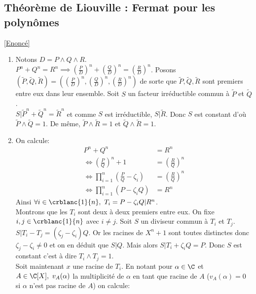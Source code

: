 \documentclass{book}
\begin{document}
	\subsection{Théorème de Liouville : Fermat pour les polynômes }
	\label{Théorème de Liouville : Fermat pour les polynômes corrigé}
	\textcolor{blue}{\hyperref[Théorème de Liouville : Fermat pour les polynômes]{[Enoncé]}}\\
	\begin{enumerate}
		\item Notons $D=P\land Q\land R$.\\
		$P^n+Q^n=R^n\implies \left(\displaystyle\frac{P}{D}\right)^n+\left(\displaystyle\frac{Q}{D}\right)^n=\left(\displaystyle\frac{R}{D}\right)^n$. Posons $(\tilde{P},\tilde{Q},\tilde{R})=\left(\left(\displaystyle\frac{P}{D}\right)^n,\left(\displaystyle\frac{Q}{D}\right)^n,\left(\displaystyle\frac{R}{D}\right)^n\right)$ de sorte que $\tilde{P},\tilde{Q},\tilde{R}$ sont premiers entre eux dans leur ensemble. Soit $S$ un facteur irréductible commun à $\tilde{P}$ et $\tilde{Q}$.\\
		$S|\tilde{P}^n+\tilde{Q}^n=\tilde{R}^n$ et comme $S$ est irréductible, $S|\tilde{R}$. Donc $S$ est constant d'où $\tilde{P}\land \tilde{Q}=1$. De même, $\tilde{P}\land \tilde{R}=1$ et $\tilde{Q}\land \tilde{R}=1$.
		\item On calcule:
		\begin{align*}
			P^n+Q^n&=R^n\\
			\iff \left(\displaystyle\frac{P}{Q}\right)^n+1&=\left(\displaystyle\frac{R}{Q}\right)^n\\
			\iff \displaystyle\prod\limits_{i=1}^n{\left(\displaystyle\frac{P}{Q}-\zeta_i\right)}&=\left(\displaystyle\frac{R}{Q}\right)^n\\
			\iff \displaystyle\prod\limits_{i=1}^n{(P-\zeta_iQ)}&=R^n
		\end{align*}
		Ainsi $\forall i\in \crblanc{1}{n},\ T_i=P-\zeta_iQ|R^n$.\\
		Montrons que les $T_i$ sont deux à deux premiers entre eux. On fixe $i,j\in \crblanc{1}{n}$ avec $i\ne j$. Soit $S$ un diviseur commun à $T_i$ et $T_j$.\\
		$S|T_i-T_j=(\zeta_j-\zeta_i)Q$. Or les racines de $X^n+1$ sont toutes distinctes donc $\zeta_j-\zeta_i\ne 0$ et on en déduit que $S|Q$. Mais alors $S|T_i+\zeta_iQ=P$. Donc $S$ est constant c'est à dire $T_i\land T_j=1$.\\
		Soit maintenant $x$ une racine de $T_i$. En notant pour $\alpha\in \C$ et $A\in \C[X],\ v_A(\alpha)$ la multiplicité de $\alpha$ en tant que racine de $A$ ($v_A(\alpha)=0$ si $\alpha$ n'est pas racine de $A$) on calcule:

\end{enumerate}
\end{document}
